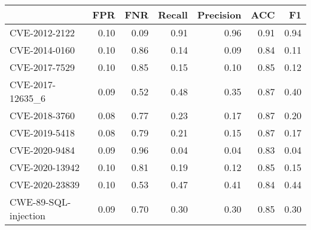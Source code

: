 \begin{tabular}{lrrrrrr}
\toprule
{} &  FPR &  FNR &  Recall &  Precision &  ACC &   F1 \\
\midrule
CVE-2012-2122        & 0.10 & 0.09 &    0.91 &       0.96 & 0.91 & 0.94 \\
CVE-2014-0160        & 0.10 & 0.86 &    0.14 &       0.09 & 0.84 & 0.11 \\
CVE-2017-7529        & 0.10 & 0.85 &    0.15 &       0.10 & 0.85 & 0.12 \\
CVE-2017-12635\_6     & 0.09 & 0.52 &    0.48 &       0.35 & 0.87 & 0.40 \\
CVE-2018-3760        & 0.08 & 0.77 &    0.23 &       0.17 & 0.87 & 0.20 \\
CVE-2019-5418        & 0.08 & 0.79 &    0.21 &       0.15 & 0.87 & 0.17 \\
CVE-2020-9484        & 0.09 & 0.96 &    0.04 &       0.04 & 0.83 & 0.04 \\
CVE-2020-13942       & 0.10 & 0.81 &    0.19 &       0.12 & 0.85 & 0.15 \\
CVE-2020-23839       & 0.10 & 0.53 &    0.47 &       0.41 & 0.84 & 0.44 \\
CWE-89-SQL-injection & 0.09 & 0.70 &    0.30 &       0.30 & 0.85 & 0.30 \\
\bottomrule
\end{tabular}

